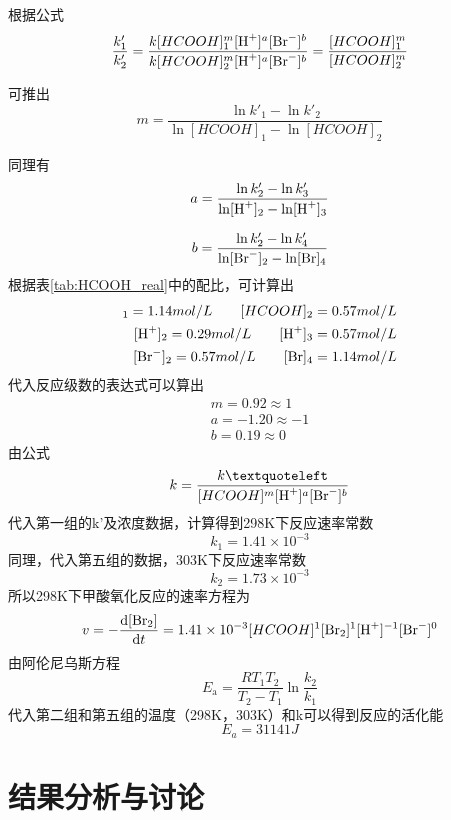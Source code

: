 \documentclass[12pt,hyperref,a4paper,UTF8]{ctexart}
\begin{document}
根据公式
$$
\frac{k'_1}{k'_2} = \frac{k[HCOOH]_1^m[\ce{H+}]^a[\ce{Br-}]^b}{k[HCOOH]_2^m[\ce{H+}]^a[\ce{Br-}]^b} = \frac{[HCOOH]_1^m}{[HCOOH]_2^m}
$$

可推出
$$
m=\frac{\ln k'_1-\ln k'_2}{\ln[HCOOH]_1-\ln [HCOOH]_2}
$$

同理有
$$
a=\frac{\ln k'_2-\ln k'_3}{\ln[\ce{H+}]_2-\ln [\ce{H+}]_3}
$$

$$
b=\frac{\ln k'_2-\ln k'_4}{\ln[\ce{Br-}]_2-\ln [\ce{Br}]_4}
$$
根据表\ref{tab:HCOOH_real}中的配比，可计算出
\begin{align*}
	[HCOOH]_1=1.14 mol/L \qquad [HCOOH]_2= 0.57 mol/L \\
	[\ce{H+}]_2=0.29 mol/L\qquad [\ce{H+}]_3=0.57mol/L \\
	[\ce{Br-}]_2=0.57mol/L \qquad[\ce{Br}]_4=1.14mol/L
\end{align*}
代入反应级数的表达式可以算出
\begin{align*}
	m=0.92 \approx 1 \\
	a=-1.20 \approx -1\\
	b=0.19 \approx 0
\end{align*}
由公式
$$
k=\frac{k‘}{[HCOOH]^m[\ce{H+}]^a[\ce{Br-}]^b}
$$
代入第一组的k'及浓度数据，计算得到298K下反应速率常数
$$
k_1=1.41 \times 10^{-3}
$$
同理，代入第五组的数据，303K下反应速率常数
$$k_2=1.73\times 10^{-3}
$$
所以298K下甲酸氧化反应的速率方程为
$$
v=-\frac{\mathrm{d [\ce{Br2]}}}{\mathrm{d} t}=1.41\times10^{-3}[HCOOH]^1[\ce{Br2}]^1[\ce{H+}]^{-1}[\ce{Br-}]^0
$$
由阿伦尼乌斯方程
$$
E_{\mathrm{a}}=\frac{R T_1 T_2}{T_2-T_1} \ln \frac{k_2}{k_1}
$$
代入第二组和第五组的温度（298K，303K）和k可以得到反应的活化能
$$
E_a=31141J
$$

\section{结果分析与讨论}
\end{document}
